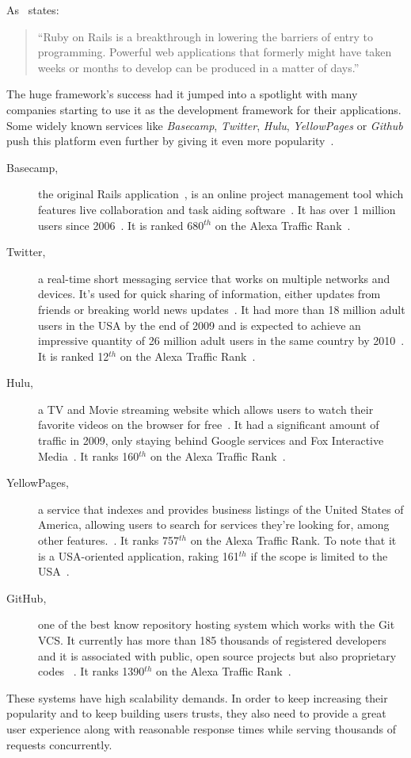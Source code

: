 As~\cite{oreilly_ror} states:
\begin{quote}
  ``Ruby on Rails is a breakthrough in lowering the barriers of entry to programming. Powerful web applications that formerly might have taken weeks or months to develop can be produced in a matter of days.''
\end{quote}
The huge framework's success had it jumped into a spotlight with many companies starting to use it as the development framework for their applications. Some widely known services like \textit{Basecamp}, \textit{Twitter}, \textit{Hulu}, \textit{YellowPages} or \textit{Github} push this platform even further by giving it even more popularity~\cite{rubyonrails_applications}.

\begin{description}
  \item[Basecamp,] the original Rails application~\cite{rubyonrails_applications}, is an online project management tool which features live collaboration and task aiding software~\cite{basecamp}. It has over 1 million users since 2006~\cite{basecamp_turns_1000000}. It is ranked 680$^{th}$ on the Alexa Traffic Rank~\cite{alexa}.
  \item[Twitter,] a real-time short messaging service that works on multiple networks and devices. It's used for quick sharing of information, either updates from friends or breaking world news updates~\cite{twitter}. It had more than 18 million adult users in the USA by the end of 2009 and is expected to achieve an impressive quantity of 26 million adult users in the same country by 2010~\cite{emarketer_twitter_usage}. It is ranked 12$^{th}$ on the Alexa Traffic Rank~\cite{alexa}.
  \item[Hulu,] a TV and Movie streaming website which allows users to watch their favorite videos on the browser for free~\cite{hulu}. It had a significant amount of traffic in 2009, only staying behind Google services and Fox Interactive Media~\cite{hulu_growth}. It ranks 160$^{th}$ on the Alexa Traffic Rank~\cite{alexa}.
  \item[YellowPages,] a service that indexes and provides business listings of the United States of America, allowing users to search for services they're looking for, among other features.~\cite{yellowpages}.  It ranks 757$^{th}$ on the Alexa Traffic Rank. To note that it is a USA-oriented application, raking 161$^{th}$ if the scope is limited to the USA~\cite{alexa}.
  \item[GitHub,] one of the best know repository hosting system which works with the Git VCS. It currently has more than 185 thousands of registered developers and it is associated with public, open source projects but also proprietary codes ~\cite{github}. It ranks 1390$^{th}$ on the Alexa Traffic Rank~\cite{alexa}.
\end{description}
These systems have high scalability demands. In order to keep increasing their popularity and to keep building users trusts, they also need to provide a great user experience along with reasonable response times while serving thousands of requests concurrently.

